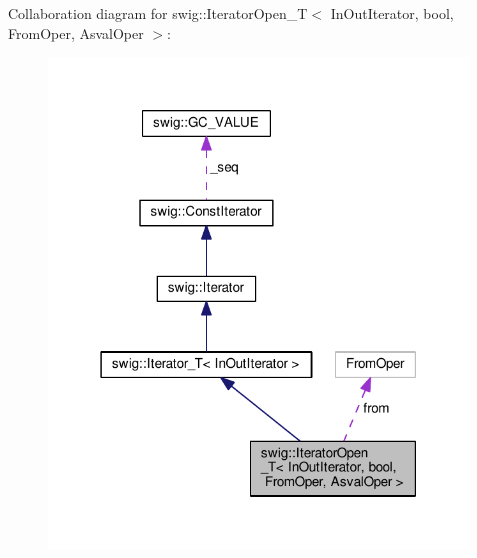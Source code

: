 Collaboration diagram for swig\+:\+:Iterator\+Open\+\_\+T$<$ In\+Out\+Iterator, bool, From\+Oper, Asval\+Oper $>$\+:
\nopagebreak
\begin{figure}[H]
\begin{center}
\leavevmode
\includegraphics[width=316pt]{classswig_1_1IteratorOpen__T_3_01InOutIterator_00_01bool_00_01FromOper_00_01AsvalOper_01_4__coll__graph}
\end{center}
\end{figure}
